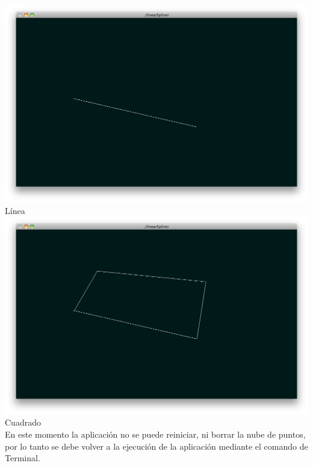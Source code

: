\documentclass[]{article}
\begin{document}
   \centering
   \includegraphics[width=\mySize in]{8.png} \\
Línea\\
   \centering
   \includegraphics[width=\mySize in]{9.png} \\
Cuadrado\\
\flushleft
En este momento la aplicación no se puede reiniciar, ni borrar la nube de puntos, por lo tanto se debe
volver a la ejecución de la aplicación mediante el comando de Terminal.
\end{document}
